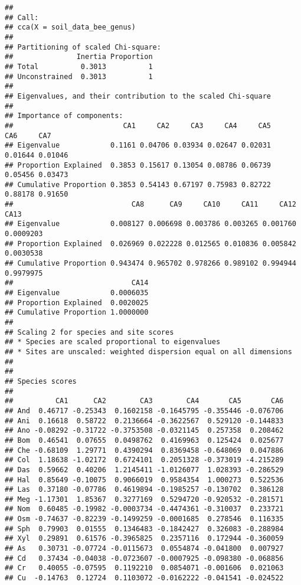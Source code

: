 \documentclass[
]{article}
\begin{document}
\begin{verbatim}
## 
## Call:
## cca(X = soil_data_bee_genus) 
## 
## Partitioning of scaled Chi-square:
##               Inertia Proportion
## Total          0.3013          1
## Unconstrained  0.3013          1
## 
## Eigenvalues, and their contribution to the scaled Chi-square 
## 
## Importance of components:
##                          CA1     CA2     CA3     CA4     CA5     CA6     CA7
## Eigenvalue            0.1161 0.04706 0.03934 0.02647 0.02031 0.01644 0.01046
## Proportion Explained  0.3853 0.15617 0.13054 0.08786 0.06739 0.05456 0.03473
## Cumulative Proportion 0.3853 0.54143 0.67197 0.75983 0.82722 0.88178 0.91650
##                            CA8      CA9     CA10     CA11     CA12      CA13
## Eigenvalue            0.008127 0.006698 0.003786 0.003265 0.001760 0.0009203
## Proportion Explained  0.026969 0.022228 0.012565 0.010836 0.005842 0.0030538
## Cumulative Proportion 0.943474 0.965702 0.978266 0.989102 0.994944 0.9979975
##                            CA14
## Eigenvalue            0.0006035
## Proportion Explained  0.0020025
## Cumulative Proportion 1.0000000
## 
## Scaling 2 for species and site scores
## * Species are scaled proportional to eigenvalues
## * Sites are unscaled: weighted dispersion equal on all dimensions
## 
## 
## Species scores
## 
##          CA1      CA2        CA3        CA4       CA5       CA6
## And  0.46717 -0.25343  0.1602158 -0.1645795 -0.355446 -0.076706
## Ani  0.16618  0.58722  0.2136664 -0.3622567  0.529120 -0.144833
## Ano -0.08292 -0.31722 -0.3753508 -0.0321145  0.257358  0.208462
## Bom  0.46541  0.07655  0.0498762  0.4169963  0.125424  0.025677
## Che -0.68109  1.29771  0.4390294  0.8369458 -0.648069  0.047886
## Col  1.18638 -1.02172  0.6724101  0.2051328 -0.373019 -4.215289
## Das  0.59662  0.40206  1.2145411 -1.0126077  1.028393 -0.286529
## Hal  0.85649 -0.10075  0.9066019  0.9584354  1.000273  0.522536
## Las  0.37180 -0.07786  0.4619894 -0.1985257 -0.130702  0.386128
## Meg -1.17301  1.85367  0.3277169  0.5294720 -0.920532 -0.281571
## Nom  0.60485 -0.19982 -0.0003734 -0.4474361 -0.310037  0.233721
## Osm -0.74637 -0.82239 -0.1499259 -0.0001685  0.278546  0.116335
## Sph  0.79903  0.01555  0.1346483 -0.1842427  0.326083 -0.288984
## Xyl  0.29891  0.61576 -0.3965825  0.2357116  0.172944 -0.360059
## As   0.30731 -0.07724 -0.0115673  0.0554874 -0.041800  0.007927
## Cd   0.37434 -0.04038 -0.0723607 -0.0007925 -0.098380 -0.068856
## Cr   0.40055 -0.07595  0.1192210  0.0854071 -0.001606  0.021063
## Cu  -0.14763  0.12724  0.1103072 -0.0162222 -0.041541 -0.024522

\end{verbatim}
\end{document}
